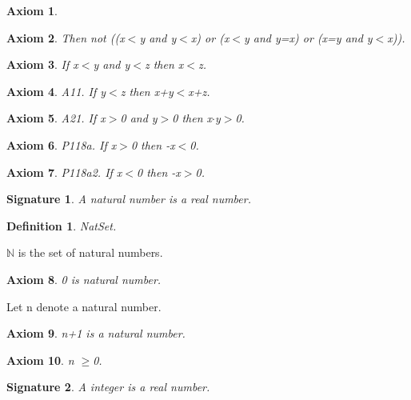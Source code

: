 \documentclass{article}
\newenvironment{forthel}{\begin{leftbar}}{\end{leftbar}}
\newtheorem{axiom}{Axiom}
\newtheorem{definition}{Definition}
\newtheorem{signature}{Signature}
\begin{document}
\begin{forthel}
\begin{axiom}
\end{axiom}
\begin{axiom} Then not ((x$<$y and y$<$x) or (x$<$y and y=x) or (x=y and y$<$x)).

\end{axiom}
\begin{axiom} If x$<$y and y$<$z then x$<$z.

\end{axiom}





\begin{axiom} A11. If y$<$z then x+y$<$x+z.

\end{axiom}
\begin{axiom} A21. If x$>$0 and y$>$0 then x$\cdot$y$>$0.

\end{axiom}

\begin{axiom} P118a. If x$>$0 then -x$<$0.

\end{axiom}
\begin{axiom} P118a2. If x$<$0 then -x$>$0.

\end{axiom}




\begin{signature} A natural number is a real number.

\end{signature}

\begin{definition} NatSet.

\end{definition}
$\mathbb{N}$ is the set of natural numbers.

\begin{axiom} 0 is natural number.

\end{axiom}
Let n denote a natural number.
\begin{axiom} n+1 is a natural number.

\end{axiom}

\begin{axiom} n $\geq$0.

\end{axiom}

\begin{signature} A integer is a real number.


\end{signature}
\end{forthel}
\end{document}
